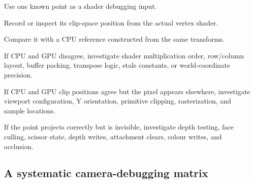 \hypertarget{02-foundations-ii-ch037-step-7-compare-cpu-and-gpu}{}

Use one known point as a shader debugging input.

Record or inspect its clip-space position from the actual vertex shader.

Compare it with a CPU reference constructed from the same transforms.

If CPU and GPU disagree, investigate shader multiplication order, row/column layout, buffer packing, transpose logic, stale constants, or world-coordinate precision.

If CPU and GPU clip positions agree but the pixel appears elsewhere, investigate viewport configuration, Y orientation, primitive clipping, rasterization, and sample locations.

If the point projects correctly but is invisible, investigate depth testing, face culling, scissor state, depth writes, attachment clears, colour writes, and occlusion.

\subsection{A systematic camera-debugging matrix}\label{02-foundations-ii-ch037-a-systematic-camera-debugging-matrix}

\hypertarget{02-foundations-ii-ch037-a-systematic-camera-debugging-matrix}{}

